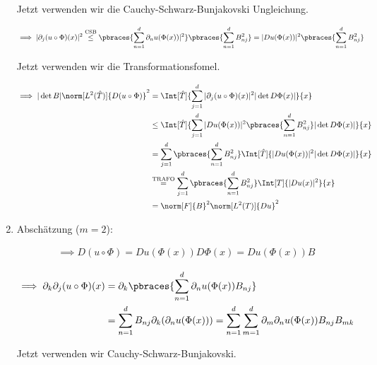 \begin{solution}
\begin{enumerate}[label = \arabic*.]
  Jetzt verwenden wir die Cauchy-Schwarz-Bunjakovski Ungleichung.

  \begin{align*}
    \implies
    |\partial_j (u \circ \Phi)(x)|^2
    & \stackrel
    {
      \mathrm{CSB}
    }
    {\leq}
    \pbraces
    {
      \sum_{n=1}^d
      \partial_n u(\Phi(x))|^2
    }
    \pbraces
    {
      \sum_{n=1}^d
      B_{nj}^2
    }
    =
    |Du(\Phi(x))|^2
    \pbraces
    {
      \sum_{n=1}^d
      B_{nj}^2
    }
    \end{align*}

  Jetzt verwenden wir die Transformationsfomel.

  \begin{align*}
    \implies
    |\det B| \norm[L^2(\hat T)]{D(u \circ \Phi)}^2
    & =
    \Int[\hat T]
    {
      \sum_{j=1}^d
      |\partial_j (u \circ \Phi)(x)|^2
      |\det D \Phi(x)|
    }{x} \\
    & \leq
    \Int[\hat T]
    {
      \sum_{j=1}^d
      |Du(\Phi(x))|^2
      \pbraces
      {
        \sum_{n=1}^d
        B_{nj}^2
      }
      |\det D \Phi(x)|
    }{x} \\
    & =
    \sum_{j=1}^d
    \pbraces
    {
      \sum_{n=1}^d
      B_{nj}^2
    }
    \Int[\hat T]
    {
      |Du(\Phi(x))|^2
      |\det D \Phi(x)|
      }{x} \\
    & \stackrel
    {
      \mathrm{TRAFO}
    }{=}
    \sum_{j=1}^d
    \pbraces
    {
      \sum_{n=1}^d
      B_{nj}^2
    }
    \Int[T]
    {
      |Du(x)|^2
    }{x} \\
    & =
    \norm[F]{B}^2 \norm[L^2(T)]{Du}^2
  \end{align*}

  \item Abschätzung ($m = 2$):

  \begin{align*}
    \implies
    D(u \circ \Phi) = Du(\Phi(x))D\Phi(x) = Du(\Phi(x))B
  \end{align*}

  \begin{align*}
    \implies
    \partial_k \partial_j (u \circ \Phi)(x)
    &=
    \partial_k \pbraces
    {
      \sum_{n=1}^d
      \partial_n u(\Phi(x)) B_{nj}
    } \\
    &=
    \sum_{n=1}^d
    B_{nj} \partial_k (\partial_n u(\Phi(x)))
    =
    \sum_{n=1}^d
    \sum_{m=1}^d
    \partial_m \partial_n u(\Phi(x)) B_{nj} B_{mk}
  \end{align*}

  Jetzt verwenden wir Cauchy-Schwarz-Bunjakovski.


\end{enumerate}
\end{solution}
